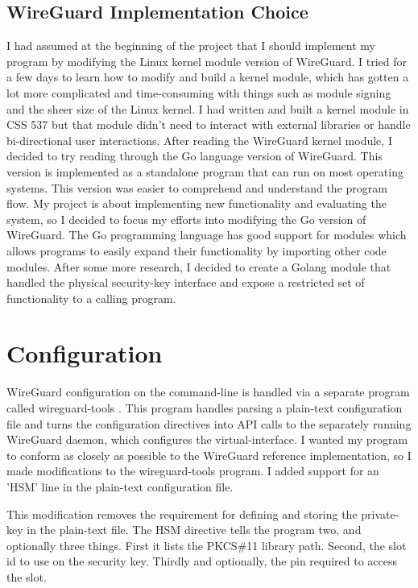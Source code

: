 \documentclass [11pt, proquest] {uwthesis}[2020/02/24]
\begin{document}
\subsection{WireGuard Implementation Choice}
I had assumed at the beginning of the project that I should implement my program by modifying the Linux kernel module version of WireGuard. I tried for a few days to learn how to modify and build a kernel module, which has gotten a lot more complicated and time-consuming with things such as module signing and the sheer size of the Linux kernel. I had written and built a kernel module in CSS 537 but that module didn't need to interact with external libraries or handle bi-directional user interactions. After reading the WireGuard kernel module, I decided to try reading through the Go language version of WireGuard. This version is implemented as a standalone program that can run on most operating systems. This version was easier to comprehend and understand the program flow. My project is about implementing new functionality and evaluating the system, so I decided to focus my efforts into modifying the Go version of WireGuard.
The Go programming language has good support for modules which allows programs to easily expand their functionality by importing other code modules. After some more research, I decided to create a Golang module that handled the physical security-key interface and expose a restricted set of functionality to a calling program. 

\section{Configuration}
WireGuard configuration on the command-line is handled via a separate program called wireguard-tools \cite{noauthor_wireguard-tools_2022}. This program handles parsing a plain-text configuration file and turns the configuration directives into API calls to the separately running WireGuard daemon, which configures the virtual-interface. I wanted my program to conform as closely as possible to the WireGuard reference implementation, so I made modifications to the wireguard-tools program. I added support for an 'HSM' line in the plain-text configuration file. 

This modification removes the requirement for defining and storing the private-key in the plain-text file. The HSM directive tells the program two, and optionally three things. First it lists the PKCS\#11 library path. Second, the slot id  to use on the security key. Thirdly and optionally, the pin required to access the slot.
\end{document}
